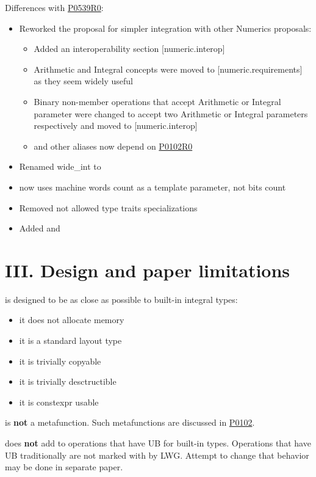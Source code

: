 \documentclass[ebook,10pt,oneside,openany,final]{memoir}
\begin{document}
Differences with \href{https://wg21.link/P0539R0}{P0539R0}:
\begin{itemize}
\item Reworked the proposal for simpler integration with other Numerics proposals:
    \begin{itemize}
       \item Added an interoperability section [numeric.interop]
       \item Arithmetic and Integral concepts were moved to [numeric.requirements] as they seem widely useful
       \item Binary non-member operations that accept Arithmetic or Integral parameter were changed to accept two Arithmetic or Integral parameters respectively and moved to [numeric.interop]
       \item {} and other aliases now depend on \href{https://wg21.link/P0102R0}{P0102R0}
    \end{itemize}
\item Renamed wide_int to 
\item {} now uses machine words count as a template parameter, not bits count
\item Removed not allowed type traits specializations
\item Added  and 
\end{itemize}



\section{III. Design and paper limitations}
 is designed to be as close as possible to built-in integral types:
\begin{itemize}
\item it does not allocate memory
\item it is a standard layout type
\item it is trivially copyable
\item it is trivially desctructible
\item it is constexpr usable
\end{itemize}

 is \textbf{not} a metafunction. Such metafunctions are discussed in \href{https://wg21.link/P0102}{P0102}.

 does \textbf{not} add  to operations that have UB for built-in types. Operations that have UB traditionally are not marked with  by LWG. Attempt to change that behavior may be done in separate paper.
\end{document}
